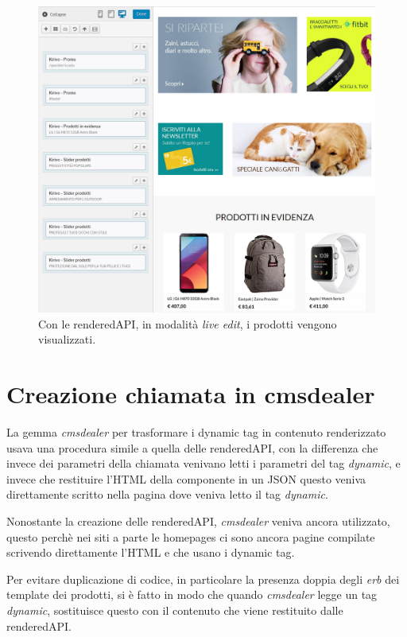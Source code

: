 \begin{figure}
  \includegraphics[width=\textwidth]{figure/livedit.png}
  \caption{Con le renderedAPI, in modalità \emph{live edit}, i prodotti vengono visualizzati.}
  \label{fig:kspec}
\end{figure}

\newpage
\section{Creazione chiamata in cmsdealer}

La gemma \emph{cmsdealer} per trasformare i dynamic tag in contenuto renderizzato usava una procedura simile 
a quella delle renderedAPI, con la differenza che invece dei parametri della chiamata venivano letti i parametri
del tag \emph{dynamic}, e invece che restituire l'HTML della componente in un JSON questo veniva direttamente
scritto nella pagina dove veniva letto il tag \emph{dynamic}.

Nonostante la creazione delle renderedAPI, \emph{cmsdealer} veniva ancora utilizzato,
questo perchè nei siti a parte le homepages ci sono ancora pagine compilate scrivendo direttamente l'HTML
e che usano i dynamic tag.

Per evitare duplicazione di codice, in particolare la presenza doppia degli \emph{erb} dei template dei prodotti,
si è fatto in modo che quando \emph{cmsdealer} legge un tag \emph{dynamic}, sostituisce questo con il contenuto
che viene restituito dalle renderedAPI.

